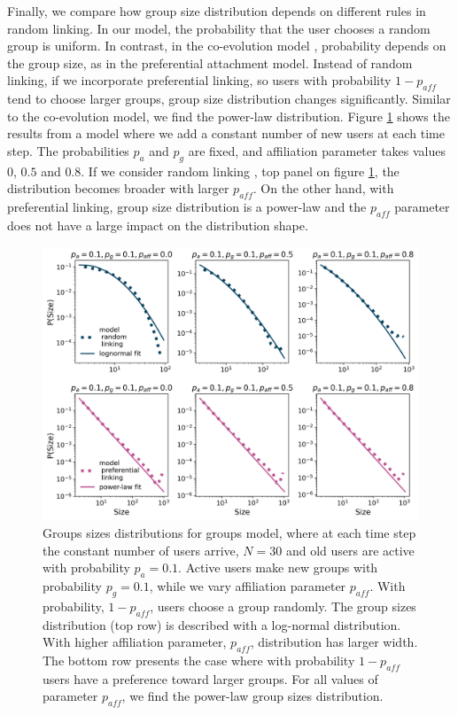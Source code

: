 Finally, we compare how group size distribution depends on different rules in random linking. In our model, the probability that the user chooses a random group is uniform. In contrast, in the co-evolution model \cite{zheleva2009co}, probability depends on the group size, as in the preferential attachment model. Instead of random linking, if we incorporate preferential linking, so users with probability $1-p_{aff}$ tend to choose larger groups, group size distribution changes significantly. Similar to the co-evolution model, we find the power-law distribution. Figure \ref{fig:model_comp} shows the results from a model where we add a constant number of new users at each time step. The probabilities $p_a$ and $p_g$ are fixed, and affiliation parameter takes values $0$, $0.5$ and $0.8$. If we consider random linking , top panel on figure \ref{fig:model_comp}, the distribution becomes broader with larger $p_{aff}$. On the other hand, with preferential linking, group size distribution is a power-law and the $p_{aff}$ parameter does not have a large impact on the distribution shape.    

\begin{figure}[h]
	\centering
	\includegraphics[width=0.7\linewidth]{figures/model_N30.png}
	\caption[Comparison between preferential and random linking in groups growth model.]{Groups sizes distributions for groups model, where at each time step the constant number of users arrive, $N=30$ and old users are active with probability $p_a=0.1$. Active users make new groups with probability $p_g=0.1$, while we vary affiliation parameter $p_{aff}$. With probability, $1-p_{aff}$, users choose a group randomly. The group sizes distribution (top row) is described with a log-normal distribution. With higher affiliation parameter, $p_{aff}$, distribution has larger width. The bottom row presents the case where with probability $1-p_{aff}$ users have a preference toward larger groups. For all values of parameter $p_{aff}$, we find the power-law group sizes distribution.}
	\label{fig:model_comp}
\end{figure}


